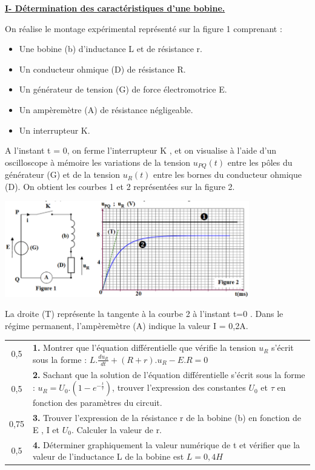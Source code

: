 \documentclass[12pt]{article}
\begin{document}
\textbf{\underline{I- Détermination des caractéristiques d’une bobine.}}

On réalise le montage expérimental représenté sur la figure 1 comprenant :
\begin{itemize}
	\item  Une bobine (b) d’inductance L et de résistance r.
	\item  Un conducteur ohmique (D) de résistance R.
	\item  Un générateur de tension (G) de force électromotrice E.
	\item  Un ampèremètre (A) de résistance négligeable.
	\item  Un interrupteur K.
\end{itemize}

A l’instant t = 0, on ferme l’interrupteur K , et on visualise à l’aide d’un oscilloscope à mémoire les
variations de la tension $u_{PQ}(t)$ entre les pôles du générateur (G) et de la tension $u_R(t)$ entre les bornes du conducteur ohmique (D). On obtient les courbes 1 et 2 représentées sur la figure 2.


\begin{center}
  \includegraphics[width=0.8\textwidth]{./img/Rl01.png}
\end{center}



La droite (T) représente la tangente à la courbe 2 à l’instant t=0 .
Dans le régime permanent, l’ampèremètre (A) indique la valeur I = 0,2A.

\begin{tabular}{c|l}
	0,5  & \makecell[l]{\textbf{1. }Montrer que l’équation différentielle que vérifie la tension $u_R$ s’écrit sous la forme \\: $L.\frac{du_R}{dt} + (R+r).u_R - E.R = 0$}\\
	0,5 & \makecell[l]{\textbf{2. }Sachant que la solution de l’équation différentielle s’écrit sous la forme : $u_R = U_0.(1-e^{-\frac{t}{\tau}})$,\\trouver l’expression des constantes $U_0$ et $\tau$ en fonction des paramètres du circuit.}\\
		0,75 & \makecell[l]{\textbf{3. }Trouver l’expression de la résistance r de la bobine (b) en fonction de E , I et $U_0$. Calculer \\la valeur
de r.}\\
			0,5 & \makecell[l]{\textbf{4. }Déterminer graphiquement la valeur numérique de t et vérifier que la valeur de l’inductance \\L de la
bobine est $L=0,4H$}\\
		\end{tabular}
\end{document}

